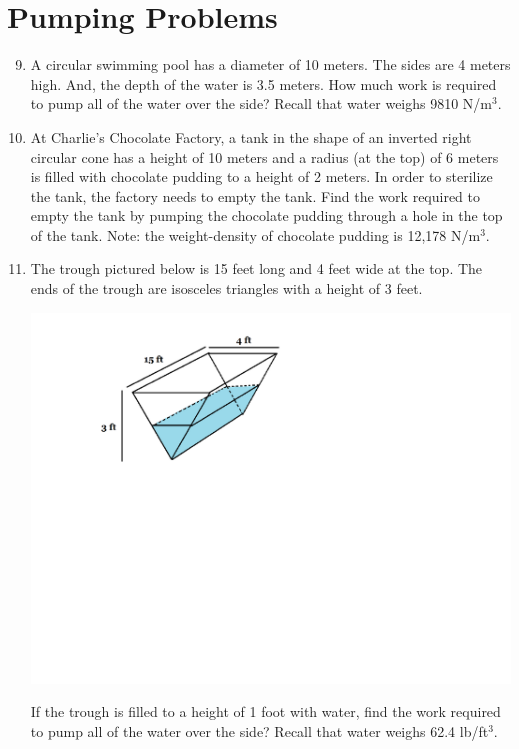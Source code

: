 \documentclass[12pt]{article}
\newif\ifans
\begin{document}
\section*{Pumping Problems}

\begin{enumerate}
\setcounter{enumi}{8}

\item A circular swimming pool has a diameter of 10 meters.  The sides are 4 meters high.  And, the depth of the water is 3.5 meters.  How much work is required to pump all of the water over the side?  Recall that water weighs 9810 N/m$^3$.

\ifans{\fbox{$6.067 \times 10^6$ J}} \fi

\item At Charlie's Chocolate Factory, a tank in the shape of an inverted right circular cone has a height of 10 meters and a radius (at the top) of 6 meters is filled with chocolate pudding to a height of 2 meters.  In order to sterilize the tank, the factory needs to empty the tank.  Find the work required to empty the tank by pumping the chocolate pudding through a hole in the top of the tank. Note: the weight-density of chocolate pudding is 12,178 N/m$^3$.

\ifans{\fbox{$\frac{2,484,312}{25}\pi$ J}} \fi

\item The trough pictured below is 15 feet long and 4 feet wide at the top.  The ends of the trough are isosceles triangles with a height of 3 feet.  
\begin{center}
\includegraphics[scale=0.6]{trough.pdf}
\end{center}
If the trough is filled to a height of 1 foot with water, find the work required to pump all of the water over the side?  Recall that water weighs 62.4 lb/ft$^3$.


\end{enumerate}
\end{document}
